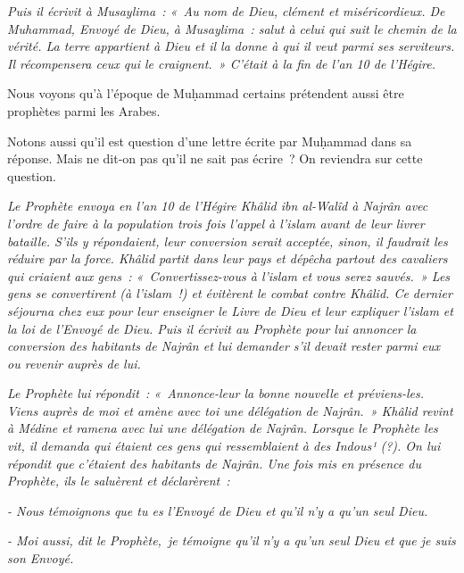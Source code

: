 \emph{Puis il écrivit à Musaylima~: «~Au nom de Dieu, clément et
miséricordieux. De Muhammad, Envoyé de Dieu, à Musaylima~: salut à celui
qui suit le chemin de la vérité. La terre appartient à Dieu et il la
donne à qui il veut parmi ses serviteurs. Il récompensera ceux qui le
craignent.~» C'était à la fin de l'an 10 de l'Hégire.}

Nous voyons qu'à l'époque de Muḥammad certains prétendent aussi être
prophètes parmi les Arabes.

Notons aussi qu'il est question d'une lettre écrite par Muḥammad dans sa
réponse. Mais ne dit-on pas qu'il ne sait pas écrire~? On reviendra sur
cette question.


\emph{Le Prophète envoya en l'an 10 de l'Hégire Khâlid ibn al-Walîd à
Najrân avec l'ordre de faire à la population trois fois l'appel à
l'islam avant de leur livrer bataille. S'ils y répondaient, leur
conversion serait acceptée, sinon, il faudrait les réduire par la force.
Khâlid partit dans leur pays et dépêcha partout des cavaliers qui
criaient aux gens~: «~Convertissez-vous à l'islam et vous serez
sauvés.~» Les gens se convertirent (à l'islam~!) et évitèrent le combat
contre Khâlid. Ce dernier séjourna chez eux pour leur enseigner le Livre
de Dieu et leur expliquer l'islam et la loi de l'Envoyé de Dieu. Puis il
écrivit au Prophète pour lui annoncer la conversion des habitants de
Najrân et lui demander s'il devait rester parmi eux ou revenir auprès de
lui.}

\emph{Le Prophète lui répondit~: «~Annonce-leur la bonne nouvelle et
préviens-les. Viens auprès de moi et amène avec toi une délégation de
Najrân.~» Khâlid revint à Médine et ramena avec lui une délégation de
Najrân. Lorsque le Prophète les vit, il demanda qui étaient ces gens qui
ressemblaient à des Indous¹ (?). On lui répondit que c'étaient des
habitants de Najrân. Une fois mis en présence du Prophète, ils le
saluèrent et déclarèrent~:}

\emph{- Nous témoignons que tu es l'Envoyé de Dieu et qu'il n'y a qu'un
seul Dieu.}

\emph{- Moi aussi, dit le Prophète,~je témoigne qu'il n'y a qu'un seul
Dieu et que je suis son Envoyé.}

